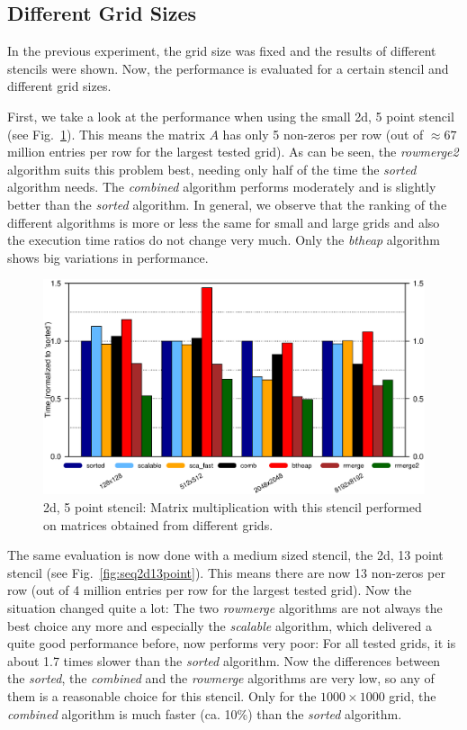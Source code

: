 \subsection{Different Grid Sizes}

In the previous experiment, the grid size was fixed and the results of different stencils were shown. Now, the performance is evaluated for a certain stencil and different grid sizes. 

First, we take a look at the performance when using the small 2d, 5 point stencil (see Fig.~\ref{fig:seq2d5point}). This means the matrix $A$ has only 5 non-zeros per row (out of $\approx 67$ million entries per row for the largest tested grid). As can be seen, the \textit{rowmerge2} algorithm suits this problem best, needing only half of the time the \textit{sorted} algorithm needs. The \textit{combined} algorithm performs moderately and is slightly better than the \textit{sorted} algorithm. In general, we observe that the ranking of the different algorithms is more or less the same for small and large grids and also the execution time ratios do not change very much. Only the \textit{btheap} algorithm shows big variations in performance.

\begin{figure}[tbp]
	\centering
	\hspace*{-7mm}\includegraphics[width=1.05\textwidth, trim={0 6.9cm 0 1cm},clip]{seq_2d5point}
	\caption{2d, 5 point stencil: Matrix multiplication with this stencil performed on matrices obtained from different grids.} 
	\label{fig:seq2d5point}
\end{figure}

The same evaluation is now done with a medium sized stencil, the 2d, 13 point stencil (see Fig.~\ref{fig:seq2d13point}). This means there are now 13 non-zeros per row (out of 4 million entries per row for the largest tested grid). Now the situation changed quite a lot: The two \textit{rowmerge} algorithms are not always the best choice any more and especially the \textit{scalable} algorithm, which delivered a quite good performance before, now performs very poor: For all tested grids, it is about 1.7 times slower than the \textit{sorted} algorithm. Now the differences between the \textit{sorted}, the \textit{combined} and the \textit{rowmerge} algorithms are very low, so any of them is a reasonable choice for this stencil. Only for the $1000 \times 1000$ grid, the \textit{combined} algorithm is much faster (ca. 10\%) than the \textit{sorted} algorithm.

